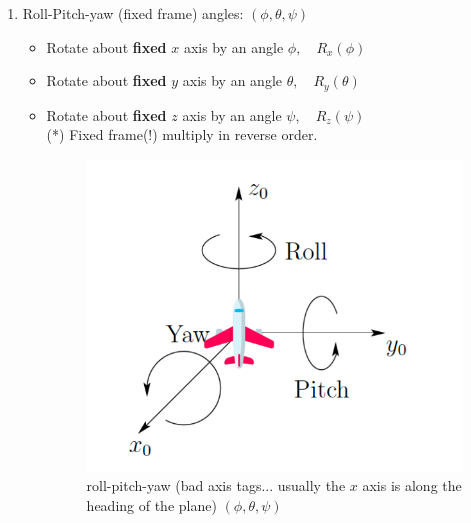 \documentclass{article}
\begin{document}
\begin{itemize}
\begin{enumerate}
 \item Roll-Pitch-yaw (fixed frame) angles: $(\phi, \theta, \psi)$
 \begin{itemize}
     \item Rotate about \textbf{fixed} $x$ axis by an angle $\phi, \quad R_{x}(\phi)$
     \item Rotate about \textbf{fixed} $y$ axis by an angle $\theta, \quad R_{y}(\theta)$
     \item Rotate about \textbf{fixed} $z$ axis by an angle $\psi, \quad R_{z}(\psi)$ \\
(*) Fixed frame(!) multiply in reverse order.
    \begin{figure}[h!]
    \centering
    \includegraphics[scale=1.5]{rollPitchYaw.png}
    \caption{roll-pitch-yaw (bad axis tags... usually the $x$ axis is along the heading of the plane) $(\phi, \theta,\psi)$}
    \label{fig:sr}
    \end{figure}


\end{itemize}
\end{enumerate}
\end{itemize}
\end{document}
